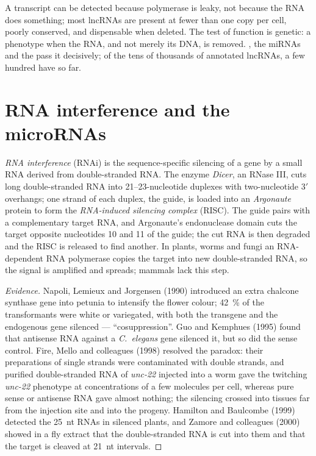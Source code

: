 \begin{remark}\label{rem:b3:rna-regulation:function}
A transcript can be detected because polymerase is leaky, not because
the RNA does something; most lncRNAs are present at fewer than one copy
per cell, poorly conserved, and dispensable when deleted. The test of
function is genetic: a phenotype when the RNA, and not merely its DNA,
is removed. \emph{}, the miRNAs and the  pass it decisively;
of the tens of thousands of annotated lncRNAs, a few hundred have so
far.
\end{remark}

\section{RNA interference and the microRNAs}

\begin{definition}\label{def:b3:rna-regulation:rnai}
\emph{RNA interference} (RNAi) is the sequence-specific silencing of a
gene by a small RNA derived from double-stranded RNA. The enzyme
\emph{Dicer}, an RNase III, cuts long double-stranded RNA into
\numrange{21}{23}-nucleotide duplexes with two-nucleotide 3$'$
overhangs; one strand of each duplex, the guide, is loaded into an
\emph{Argonaute} protein to form the \emph{RNA-induced silencing
complex} (RISC). The guide pairs with a complementary target RNA, and
Argonaute's endonuclease domain cuts the target opposite nucleotides 10
and 11 of the guide; the cut RNA is then degraded and the RISC is
released to find another. In plants, worms and fungi an RNA-dependent
RNA polymerase copies the target into new double-stranded RNA, so the
signal is amplified and spreads; mammals lack this step.
\end{definition}

\begin{proof}[Evidence]
Napoli, Lemieux and Jorgensen (1990) introduced an extra chalcone
synthase gene into petunia to intensify the flower colour; \qty{42}{\%}
of the transformants were white or variegated, with both the transgene
and the endogenous gene silenced --- ``cosuppression''. Guo and
Kemphues (1995) found that antisense RNA against a \emph{C.~elegans}
gene silenced it, but so did the sense control. Fire, Mello and
colleagues (1998) resolved the paradox: their preparations of single
strands were contaminated with double strands, and purified
double-stranded RNA of \emph{unc-22} injected into a worm gave the
twitching \emph{unc-22} phenotype at concentrations of a few molecules
per cell, whereas pure sense or antisense RNA gave almost nothing; the
silencing crossed into tissues far from the injection site and into
the progeny. Hamilton and Baulcombe (1999) detected the
\qty{25}{nt} RNAs in silenced plants, and Zamore and colleagues (2000)
showed in a fly extract that the double-stranded RNA is cut into them
and that the target is cleaved at \qty{21}{nt} intervals.
\end{proof}

